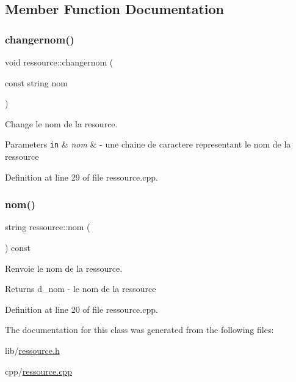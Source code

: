 \subsection{Member Function Documentation}
\hypertarget{classressource_a2c2b1bee5ae87b3accdd84c088aef2fd}{}\label{classressource_a2c2b1bee5ae87b3accdd84c088aef2fd} 
\subsubsection{\texorpdfstring{changernom()}{changernom()}}
{\footnotesize\ttfamily void ressource\+::changernom (\begin{DoxyParamCaption}\item[{const string}]{nom }\end{DoxyParamCaption})}



Change le nom de la resource. 


\begin{DoxyParams}[1]{Parameters}
\mbox{\tt in}  & {\em nom} & -\/ une chaine de caractere representant le nom de la ressource \\
\hline
\end{DoxyParams}


Definition at line 29 of file ressource.\+cpp.

\hypertarget{classressource_aff712b6d732b3f4091dd29f4349aba85}{}\label{classressource_aff712b6d732b3f4091dd29f4349aba85} 
\subsubsection{\texorpdfstring{nom()}{nom()}}
{\footnotesize\ttfamily string ressource\+::nom (\begin{DoxyParamCaption}{ }\end{DoxyParamCaption}) const}



Renvoie le nom de la ressource. 

\begin{DoxyReturn}{Returns}
d\+\_\+nom -\/ le nom de la ressource 
\end{DoxyReturn}


Definition at line 20 of file ressource.\+cpp.



The documentation for this class was generated from the following files\+:\begin{DoxyCompactItemize}
\item 
lib/\hyperlink{ressource_8h}{ressource.\+h}\item 
cpp/\hyperlink{ressource_8cpp}{ressource.\+cpp}\end{DoxyCompactItemize}
